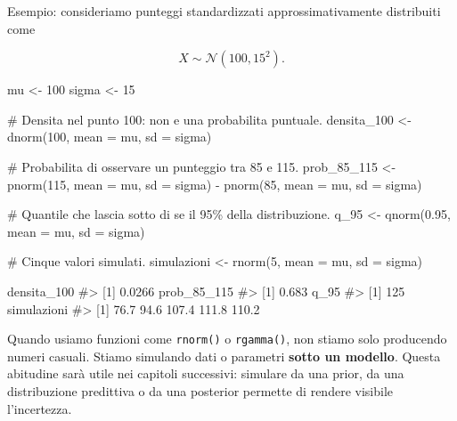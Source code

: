 \documentclass[
  italian,
  letterpaper,
  a4paper,
  11pt,
  open=any]{scrbook}
\newenvironment{Shaded}{\begin{snugshade}}{\end{snugshade}}
\newcommand{\AttributeTok}[1]{\textcolor[rgb]{0.40,0.45,0.13}{#1}}
\newcommand{\CommentTok}[1]{\textcolor[rgb]{0.37,0.37,0.37}{#1}}
\newcommand{\DecValTok}[1]{\textcolor[rgb]{0.68,0.00,0.00}{#1}}
\newcommand{\FloatTok}[1]{\textcolor[rgb]{0.68,0.00,0.00}{#1}}
\newcommand{\FunctionTok}[1]{\textcolor[rgb]{0.28,0.35,0.67}{#1}}
\newcommand{\NormalTok}[1]{\textcolor[rgb]{0.00,0.23,0.31}{#1}}
\newcommand{\OtherTok}[1]{\textcolor[rgb]{0.00,0.23,0.31}{#1}}
\newcommand{\SpecialCharTok}[1]{\textcolor[rgb]{0.37,0.37,0.37}{#1}}
\theoremstyle{plain}
\theoremstyle{definition}
\theoremstyle{definition}
\theoremstyle{remark}
\begin{document}
Esempio: consideriamo punteggi standardizzati approssimativamente
distribuiti come

\[
X \sim \mathcal{N}(100, 15^2).
\]

\begin{Shaded}
\begin{Highlighting}[]
\NormalTok{mu }\OtherTok{\textless{}{-}} \DecValTok{100}
\NormalTok{sigma }\OtherTok{\textless{}{-}} \DecValTok{15}

\CommentTok{\# Densita nel punto 100: non e una probabilita puntuale.}
\NormalTok{densita\_100 }\OtherTok{\textless{}{-}} \FunctionTok{dnorm}\NormalTok{(}\DecValTok{100}\NormalTok{, }\AttributeTok{mean =}\NormalTok{ mu, }\AttributeTok{sd =}\NormalTok{ sigma)}

\CommentTok{\# Probabilita di osservare un punteggio tra 85 e 115.}
\NormalTok{prob\_85\_115 }\OtherTok{\textless{}{-}} \FunctionTok{pnorm}\NormalTok{(}\DecValTok{115}\NormalTok{, }\AttributeTok{mean =}\NormalTok{ mu, }\AttributeTok{sd =}\NormalTok{ sigma) }\SpecialCharTok{{-}}
  \FunctionTok{pnorm}\NormalTok{(}\DecValTok{85}\NormalTok{, }\AttributeTok{mean =}\NormalTok{ mu, }\AttributeTok{sd =}\NormalTok{ sigma)}

\CommentTok{\# Quantile che lascia sotto di se il 95\% della distribuzione.}
\NormalTok{q\_95 }\OtherTok{\textless{}{-}} \FunctionTok{qnorm}\NormalTok{(}\FloatTok{0.95}\NormalTok{, }\AttributeTok{mean =}\NormalTok{ mu, }\AttributeTok{sd =}\NormalTok{ sigma)}

\CommentTok{\# Cinque valori simulati.}
\NormalTok{simulazioni }\OtherTok{\textless{}{-}} \FunctionTok{rnorm}\NormalTok{(}\DecValTok{5}\NormalTok{, }\AttributeTok{mean =}\NormalTok{ mu, }\AttributeTok{sd =}\NormalTok{ sigma)}

\NormalTok{densita\_100}
\CommentTok{\#\textgreater{} [1] 0.0266}
\NormalTok{prob\_85\_115}
\CommentTok{\#\textgreater{} [1] 0.683}
\NormalTok{q\_95}
\CommentTok{\#\textgreater{} [1] 125}
\NormalTok{simulazioni}
\CommentTok{\#\textgreater{} [1]  76.7  94.6 107.4 111.8 110.2}
\end{Highlighting}
\end{Shaded}

\begin{tcolorbox}[enhanced jigsaw, arc=.35mm, bottomrule=.15mm, bottomtitle=1mm, breakable, colback=white, colbacktitle=quarto-callout-note-color!10!white, colframe=quarto-callout-note-color-frame, coltitle=black, left=2mm, leftrule=.75mm, opacityback=0, opacitybacktitle=0.6, rightrule=.15mm, title=\textcolor{quarto-callout-note-color}{\faInfo}\hspace{0.5em}{Una lettura bayesiana delle simulazioni}, titlerule=0mm, toprule=.15mm, toptitle=1mm]

Quando usiamo funzioni come \texttt{rnorm()} o \texttt{rgamma()}, non
stiamo solo producendo numeri casuali. Stiamo simulando dati o parametri
\textbf{sotto un modello}. Questa abitudine sarà utile nei capitoli
successivi: simulare da una prior, da una distribuzione predittiva o da
una posterior permette di rendere visibile l'incertezza.

\end{tcolorbox}
\end{document}
